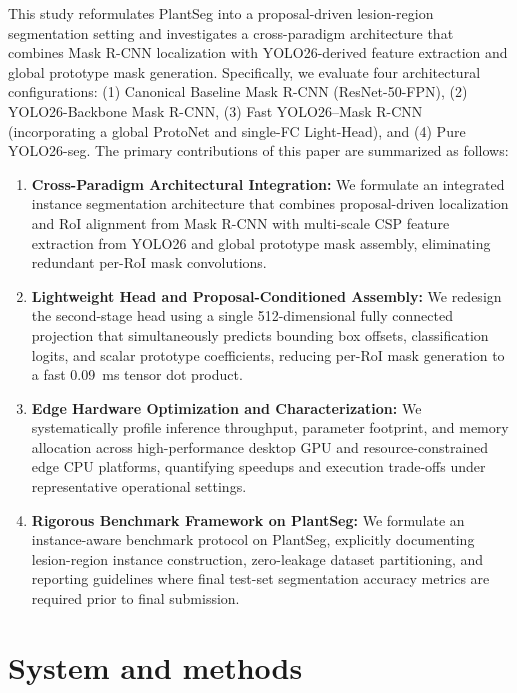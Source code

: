 \documentclass[5p,times]{elsarticle}
\begin{document}
This study reformulates PlantSeg into a proposal-driven lesion-region segmentation setting and investigates a cross-paradigm architecture that combines Mask R-CNN localization with YOLO26-derived feature extraction and global prototype mask generation. Specifically, we evaluate four architectural configurations: (1) Canonical Baseline Mask R-CNN (ResNet-50-FPN), (2) YOLO26-Backbone Mask R-CNN, (3) Fast YOLO26--Mask R-CNN (incorporating a global ProtoNet and single-FC Light-Head), and (4) Pure YOLO26-seg. The primary contributions of this paper are summarized as follows:
\begin{enumerate}
    \item \textbf{Cross-Paradigm Architectural Integration:} We formulate an integrated instance segmentation architecture that combines proposal-driven localization and RoI alignment from Mask R-CNN with multi-scale CSP feature extraction from YOLO26 and global prototype mask assembly, eliminating redundant per-RoI mask convolutions.
    \item \textbf{Lightweight Head and Proposal-Conditioned Assembly:} We redesign the second-stage head using a single 512-dimensional fully connected projection that simultaneously predicts bounding box offsets, classification logits, and scalar prototype coefficients, reducing per-RoI mask generation to a fast 0.09~ms tensor dot product.
    \item \textbf{Edge Hardware Optimization and Characterization:} We systematically profile inference throughput, parameter footprint, and memory allocation across high-performance desktop GPU and resource-constrained edge CPU platforms, quantifying speedups and execution trade-offs under representative operational settings.
    \item \textbf{Rigorous Benchmark Framework on PlantSeg:} We formulate an instance-aware benchmark protocol on PlantSeg, explicitly documenting lesion-region instance construction, zero-leakage dataset partitioning, and reporting guidelines where final test-set segmentation accuracy metrics are required prior to final submission.
\end{enumerate}

\section{System and methods}
\label{sec:methods}
\end{document}
